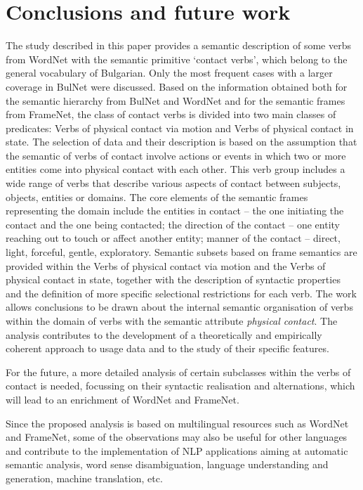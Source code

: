 \documentclass[output=paper,colorlinks,citecolor=brown]{langscibook}
\begin{document}
\section{Conclusions and future work}\label{ch5:sec:7}
The study described in this paper provides a semantic description of some verbs from WordNet with the semantic primitive `contact verbs’, which belong to the general vocabulary of Bulgarian. Only the most frequent cases with a larger coverage in BulNet were discussed. Based on the information obtained both for the semantic hierarchy from BulNet and WordNet and for the semantic frames from FrameNet, the class of contact verbs is divided into two main classes of predicates: Verbs of physical contact via motion and Verbs of physical contact in state.
The selection of data and their description is based on the assumption that the semantic of verbs of contact involve actions or events in which two or more entities come into physical contact with each other. This verb group includes a wide range of verbs that describe various aspects of contact between subjects, objects, entities or domains. The core elements of the semantic frames representing the domain include the entities in contact – the one initiating the contact and the one being contacted; the direction of the contact – one entity reaching out to touch or affect another entity; manner of the contact – direct, light, forceful, gentle, exploratory. Semantic subsets based on frame semantics are provided within the Verbs of physical contact via motion and the Verbs of physical contact in state, together with the description of syntactic properties and the definition of more specific selectional restrictions for each verb. The work allows conclusions to be drawn about the internal semantic organisation of verbs within the domain of verbs with the semantic attribute \textit{physical contact}.
The analysis contributes to the development of a theoretically and empirically coherent approach to usage data and to the study of their specific features.

For the future, a more detailed analysis of certain subclasses within the verbs of contact is needed, focussing on their syntactic realisation and alternations, which will lead to an enrichment of WordNet and FrameNet.

Since the proposed analysis is based on multilingual resources such as WordNet and FrameNet, some of the observations may also be useful for other languages and contribute to the implementation of NLP applications aiming at automatic semantic analysis, word sense disambiguation, language understanding and generation, machine translation, etc.
\end{document}
